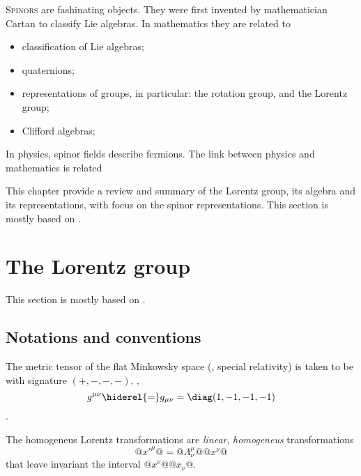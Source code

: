 

\lettrine{S}{pinors} are fashinating objects.
They were first invented by mathematician Cartan to classify Lie algebras.
In mathematics they are related to 
\begin{itemize}
   \item classification of Lie algebras;
   \item quaternions;
   \item representations of groups, in particular: the rotation group, and the
      Lorentz group;
   \item Clifford algebras;
\end{itemize}
In physics, spinor fields describe fermions.
The link between physics and mathematics is related 

This chapter  provide a review and summary of the
Lorentz group, its algebra and its representations, with focus on the spinor
representations.
This section is mostly based on \textcite{Dreiner.Haber.ea:2010}.

\section{The Lorentz group}

This section is mostly based on \textcite{Barone:2004}.

\subsection{Notations and conventions}

The metric tensor of the flat Minkowsky space (\ie, special relativity) is
taken to be with signature $(+,-,-,-)$, \ie,
\begin{dmath}
   g^{\mu\nu} \hiderel{=} g_{\mu\nu} = \diag( 1, -1, -1,-1)
\end{dmath}.

The homogeneus Lorentz transformations are \emph{linear}, \emph{homogeneus}
transformations
\begin{dmath}
   @x\prime^{\mu}@ = @\Lambda^{\mu}_{\nu}@ @x^{\nu}@
\end{dmath}
that leave invariant the interval $@ x^{\nu} @@x_{\nu}@$.
   



